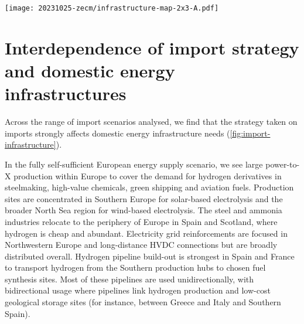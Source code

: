 \begin{figure*}
    \texttt{[image: 20231025-zecm/infrastructure-map-2x3-A.pdf]}
    \caption{\textbf{Layout of European energy infrastructure for different import scenarios.}
        Left column shows the regional electricity supply mix (pies), added HVDC and HVAC transmission capacity (lines), and the siting of battery storage (choropleth).
        Right column shows the hydrogen supply (top half of pies) and consumption (bottom half of pies), net flow and direction of hydrogen in newly built pipelines (lines), and the siting of hydrogen storage subject to geological potentials (choropleth).
        Total volumes of transmission expansion are given in TWkm, which is the sum product of the capacity and length of individual connections.
    }
    \label{fig:import-infrastructure}
\end{figure*}



\section*{Interdependence of import strategy and domestic energy infrastructures}

Across the range of import scenarios analysed, we find that the strategy taken
on imports strongly affects domestic energy infrastructure needs
(\cref{fig:import-infrastructure}).


In the fully self-sufficient European energy supply scenario, we see large
\mbox{power-to-X} production within Europe to cover the demand for hydrogen
derivatives in steelmaking, high-value chemicals, green shipping and aviation
fuels. Production sites are concentrated in Southern Europe for solar-based
electrolysis and the broader North Sea region for wind-based electrolysis. The
steel and ammonia industries relocate to the periphery of Europe in Spain and
Scotland, where hydrogen is cheap and abundant. Electricity grid reinforcements
are focused in Northwestern Europe and long-distance HVDC connections but are
broadly distributed overall. Hydrogen pipeline build-out is strongest in Spain
and France to transport hydrogen from the Southern production hubs to chosen
fuel synthesis sites. Most of these pipelines are used unidirectionally, with
bidirectional usage where pipelines link hydrogen production and low-cost
geological storage sites (for instance, between Greece and Italy and Southern
Spain).

